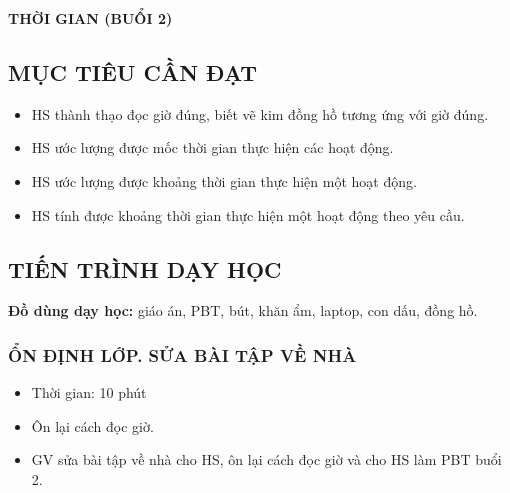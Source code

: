 \documentclass[../main.tex]{subfiles}
\begin{document}
\newpage
\setcounter{subsection}{0}
\begin{center}
        {\color{mauchinh!120}\bfseries\Large THỜI GIAN (BUỔI 2)}
\end{center}

\subsection{MỤC TIÊU CẦN ĐẠT}
\begin{itemize}
    \item HS thành thạo đọc giờ đúng, biết vẽ kim đồng hồ tương ứng với giờ đúng.
    \item HS ước lượng được mốc thời gian thực hiện các hoạt động.
    \item HS ước lượng được khoảng thời gian thực hiện một hoạt động.
    \item HS tính được khoảng thời gian thực hiện một hoạt động theo yêu cầu.
\end{itemize}

\subsection{TIẾN TRÌNH DẠY HỌC}
\textbf{Đồ dùng dạy học:} giáo án, PBT, bút, khăn ẩm, laptop, con dấu, đồng hồ.

\subsubsection{ỔN ĐỊNH LỚP. SỬA BÀI TẬP VỀ NHÀ}
\begin{hd}
    \begin{itemize}
        \item Thời gian: 10 phút
        \item Ôn lại cách đọc giờ.
    \end{itemize}
\end{hd}
\begin{itemize}
    \item GV sửa bài tập về nhà cho HS, ôn lại cách đọc giờ và cho HS làm PBT buổi 2.
\end{itemize}

\end{document}

